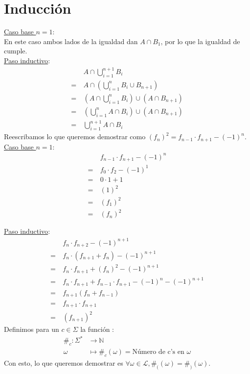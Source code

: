 \documentclass[dcc]{fcfmcourse}
\begin{document}
\section*{Inducción}
\begin{problems}
\problem 
\underline{Caso base $n = 1$}: \\
En este caso ambos lados de la igualdad dan $A\cap B_{1}$, por lo que la igualdad de cumple.\\
\newpage
\underline{Paso inductivo}:\\ 
\begin{align*}
&A \cap \bigcup\limits_{i = 1}^{n+1}B_{i}\\
=\ &A \cap \left(\bigcup\limits_{i = 1}^{n}B_{i} \cup B_{n+1}\right)\\
=\ &\left( A \cap \bigcup\limits_{i = 1}^{n}B_{i}\right) \cup \left( A \cap B_{n+1}\right)\\
=\ &\left( \bigcup\limits_{i = 1}^{n}A \cap B_{i}\right) \cup \left( A \cap B_{n+1}\right)\\
=\ &\bigcup\limits_{i = 1}^{n+1}A \cap B_{i}
\end{align*}
\problem Reescribamos lo que queremos demostrar como $(f_{n})^{2} = f_{n-1}\cdot f_{n+1} - (-1)^n$.\\

\underline{Caso base $n = 1$}: \\
\begin{align*}
& f_{n-1}\cdot f_{n+1} - (-1)^n\\
=\ &f_{0}\cdot f_{2} - (-1)^1\\
=\ &0\cdot 1 + 1\\
=\ & (1)^{2}\\
=\ & (f_{1})^{2}\\
=\ & (f_{n})^{2}
\end{align*}

\underline{Paso inductivo}:\\ 
\begin{align*}
& f_{n}\cdot f_{n+2} - (-1)^{n+1}\\
=\ & f_{n}\cdot (f_{n+1} + f_{n}) - (-1)^{n+1}\\
=\ & f_{n}\cdot f_{n+1} + (f_{n})^2 - (-1)^{n+1}\\
=\ & f_{n}\cdot f_{n+1} + f_{n-1}\cdot f_{n+1} - (-1)^n - (-1)^{n+1}\\
=\ & f_{n+1} ( f_{n} + f_{n-1})\\
=\ & f_{n+1} \cdot f_{n+1}\\
=\ & (f_{n+1})^{2}
\end{align*}
\problem 
Definimos para un $c \in \Sigma$ la función :
\begin{align*}
      \#_{c} \colon \Sigma^* &\to \mathbb{N}\\
      \omega &\mapsto \#_{c}(\omega) = \text{Número de c's en $\omega$}
\end{align*}
Con esto, lo que queremos demostrar es $\forall \omega \in \mathcal{L}, \#_{(}(\omega) = \#_{)}(\omega)$.\\


\end{problems}
\end{document}
